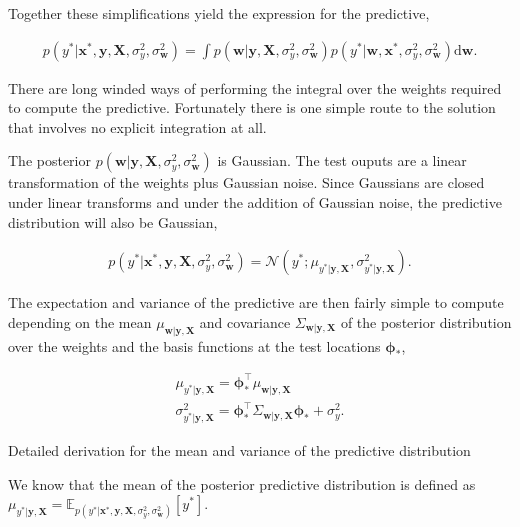 \documentclass[11pt]{article}
\begin{document}
Together these simplifications yield the expression for the predictive,

\begin{align}
p(y^* | \mathbf{x}^*, \mathbf{y},\mathbf{X},\sigma_y^2,\sigma_{\mathbf{w}}^2)  = \int p( \mathbf{w} |  \mathbf{y},\mathbf{X},\sigma_y^2,\sigma_{\mathbf{w}}^2) p(y^* | \mathbf{w} , \mathbf{x}^*, \sigma_y^2,\sigma_{\mathbf{w}}^2) \mathrm{d} \mathbf{w}.
\end{align}

There are long winded ways of performing the integral over the weights
required to compute the predictive. Fortunately there is one simple
route to the solution that involves no explicit integration at all.

The posterior
\(p( \mathbf{w} | \mathbf{y},\mathbf{X},\sigma_y^2,\sigma_{\mathbf{w}}^2)\)
is Gaussian. The test ouputs are a linear transformation of the weights
plus Gaussian noise. Since Gaussians are closed under linear transforms
and under the addition of Gaussian noise, the predictive distribution
will also be Gaussian,

\begin{align}
p(y^* | \mathbf{x}^*, \mathbf{y},\mathbf{X},\sigma_y^2,\sigma_{\mathbf{w}}^2)  = \mathcal{N}(y^* ; \mu_{y^*|\mathbf{y},\mathbf{X}},\sigma^2_{y^*| \mathbf{y},\mathbf{X}}).
\end{align}

The expectation and variance of the predictive are then fairly simple to
compute depending on the mean
\(\mu_{\mathbf{w}| \mathbf{y},\mathbf{X}}\) and covariance
\(\Sigma_{\mathbf{w}| \mathbf{y},\mathbf{X}}\) of the posterior
distribution over the weights and the basis functions at the test
locations \(\boldsymbol{\phi}_*\),

\begin{align}
\mu_{y^*|\mathbf{y},\mathbf{X}} = \boldsymbol{\phi}_{\ast}^\top \mu_{\mathbf{w}| \mathbf{y},\mathbf{X}}\\
\sigma^2_{y^*| \mathbf{y},\mathbf{X}} = \boldsymbol{\phi}_*^\top \Sigma_{\mathbf{w}| \mathbf{y},\mathbf{X}} \boldsymbol{\phi}_*  + \sigma_{y}^2.
\end{align}

 Detailed derivation for the mean and variance of the predictive
distribution

We know that the mean of the posterior predictive distribution is
defined as
\(\mu_{y^*|\mathbf{y},\mathbf{X}} = \mathbb{E}_{p(y^* | \mathbf{x}^*, \mathbf{y},\mathbf{X},\sigma_y^2,\sigma_{\mathbf{w}}^2)}[y^*]\).
\end{document}

